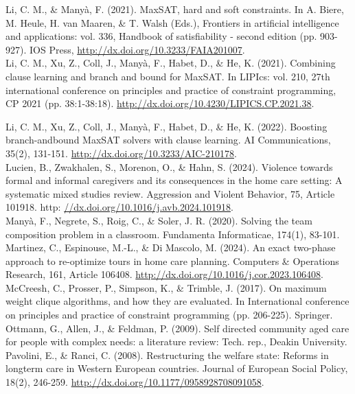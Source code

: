 \documentclass[10pt]{article}
\begin{document}
Li, C. M., \& Manyà, F. (2021). MaxSAT, hard and soft constraints. In A. Biere, M. Heule, H. van Maaren, \& T. Walsh (Eds.), Frontiers in artificial intelligence and applications: vol. 336, Handbook of satisfiability - second edition (pp. 903-927). IOS Press, \href{http://dx.doi.org/10.3233/FAIA201007}{http://dx.doi.org/10.3233/FAIA201007}.\\
Li, C. M., Xu, Z., Coll, J., Manyà, F., Habet, D., \& He, K. (2021). Combining clause learning and branch and bound for MaxSAT. In LIPIcs: vol. 210, 27th international conference on principles and practice of constraint programming, CP 2021 (pp. 38:1-38:18). \href{http://dx.doi.org/10.4230/LIPICS.CP.2021.38}{http://dx.doi.org/10.4230/LIPICS.CP.2021.38}.

Li, C. M., Xu, Z., Coll, J., Manyà, F., Habet, D., \& He, K. (2022). Boosting branch-andbound MaxSAT solvers with clause learning. AI Communications, 35(2), 131-151. \href{http://dx.doi.org/10.3233/AIC-210178}{http://dx.doi.org/10.3233/AIC-210178}.\\
Lucien, B., Zwakhalen, S., Morenon, O., \& Hahn, S. (2024). Violence towards formal and informal caregivers and its consequences in the home care setting: A systematic mixed studies review. Aggression and Violent Behavior, 75, Article 101918. http: \href{//dx.doi.org/10.1016/j.avb.2024.101918}{//dx.doi.org/10.1016/j.avb.2024.101918}.\\
Manyà, F., Negrete, S., Roig, C., \& Soler, J. R. (2020). Solving the team composition problem in a classroom. Fundamenta Informaticae, 174(1), 83-101.\\
Martinez, C., Espinouse, M.-L., \& Di Mascolo, M. (2024). An exact two-phase approach to re-optimize tours in home care planning. Computers \& Operations Research, 161, Article 106408. \href{http://dx.doi.org/10.1016/j.cor.2023.106408}{http://dx.doi.org/10.1016/j.cor.2023.106408}.\\
McCreesh, C., Prosser, P., Simpson, K., \& Trimble, J. (2017). On maximum weight clique algorithms, and how they are evaluated. In International conference on principles and practice of constraint programming (pp. 206-225). Springer.\\
Ottmann, G., Allen, J., \& Feldman, P. (2009). Self directed community aged care for people with complex needs: a literature review: Tech. rep., Deakin University.\\
Pavolini, E., \& Ranci, C. (2008). Restructuring the welfare state: Reforms in longterm care in Western European countries. Journal of European Social Policy, 18(2), 246-259. \href{http://dx.doi.org/10.1177/0958928708091058}{http://dx.doi.org/10.1177/0958928708091058}.\\
\end{document}
